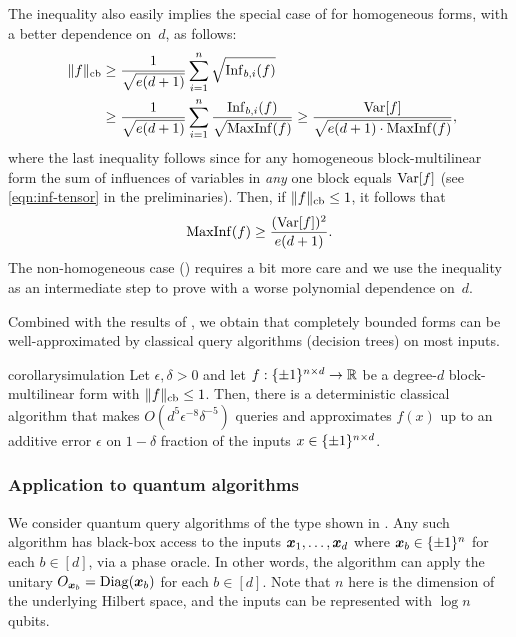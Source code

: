 The  inequality also easily implies the special case of  for homogeneous forms, with a better dependence on~$d$,  as follows:
    \begin{align*}
         \ \|f\|_{\mathrm{cb}}  &\ge \frac{1}{\sqrt{e(d+1)}} \sum_{i=1}^n \sqrt{\mathrm{Inf}_{b,i}(f)} \\
         \ &\ge \frac{1}{\sqrt{e(d+1)}}  \sum_{i=1}^n \frac{\mathrm{Inf}_{b,i}(f)}{\sqrt{\mathrm{MaxInf}(f)}} \ge  \frac{\mathrm{Var}[f]}{\sqrt{e(d+1)\cdot  \mathrm{MaxInf}(f)}},
    \end{align*}
    where the last inequality follows  since for any homogeneous block-multilinear form the sum of influences of variables in \emph{any} one block equals $\mathrm{Var}[f]$ (see \eqref{eqn:inf-tensor} in the preliminaries). Then, if $\|f\|_{\mathrm{cb}} \le 1$, it follows that \[
    \mathrm{MaxInf}(f) \ge \frac{(\mathrm{Var}[f])^2}{e(d+1)}.
    \]
    The non-homogeneous case () requires a bit more care and we use the inequality as an intermediate step to prove  with a worse polynomial dependence on~$d$.



Combined with the results of \cite{AA14}, we obtain that completely bounded forms can be well-approximated by classical query algorithms (decision trees) on most inputs.

\begin{restatable}{corollary}{simulation}
\label{cor:sim}
 Let $\epsilon, \delta > 0$ and let $f: \{\pm 1\}^{n \times d} \to {\mathbb R}$ be a degree-$d$ block-multilinear form with $\|f\|_{\mathrm{cb}} \le 1$. Then, there is a deterministic classical algorithm that makes $O(d^5\epsilon^{-8}\delta^{-5})$ queries and approximates $f(x)$ up to an additive error $\epsilon$ on $1-\delta$ fraction of the inputs $x \in \{\pm 1\}^{n \times d}$.
\end{restatable}

\subsubsection{Application to quantum algorithms}
\label{sec:quantum}

We consider quantum query algorithms of the type shown in .  Any such algorithm has black-box access to the inputs $\boldsymbol{x}_1, \ldots, \boldsymbol{x}_d$ where $\boldsymbol{x}_b \in \{\pm 1\}^{n}$ for each $b \in [d]$, via a phase oracle.  In other words, the algorithm can apply the unitary $O_{\boldsymbol{x}_b} = \mathrm{Diag}(\boldsymbol{x}_b)$ for each $b \in [d]$.  Note that $n$ here is the dimension of the underlying Hilbert space, and the inputs can be represented with $\log n$ qubits.


